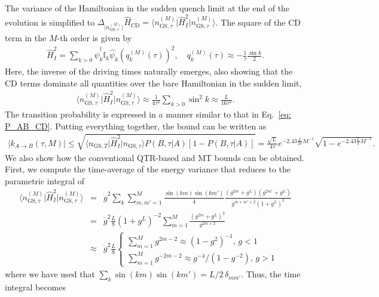 \documentclass[prl,aps,amssymb,twocolumn,superscriptaddress, notitlepage, longbibliography]{revtex4-2}
\begin{document}
The variance of the Hamiltonian in the sudden quench limit at the end of the evolution is simplified to $\Delta_{\lvert n^{(M)}_{\mathrm{GS},\tau}\rangle}\hat H_\mathrm{CD}=\langle n^{(M)}_{\mathrm{GS},\tau}\lvert\hat H^2_I\rvert n^{(M)}_{\mathrm{GS},\tau}\rangle$. The square of the CD term in the $M$-th order is given by
\begin{eqnarray}
\hat H^2_I=\sum_{k>0}\hat\psi^\dagger_k\mathbb I_k\hat\psi_k\left(q^{(M)}_k(\tau)\right)^2,\quad q^{(M)}_k(\tau)\approx-\frac{1}{\tau}\frac{\sin k}{2}.
\end{eqnarray}
Here, the inverse of the driving times naturally emerges, also showing that the CD terms dominate all quantities over the bare Hamiltonian in the sudden limit,
\begin{eqnarray}
    \langle n^{(M)}_{\mathrm{GS},\tau}\lvert\hat H^2_I\rvert n^{(M)}_{\mathrm{GS},\tau}\rangle\approx\frac{1}{4\tau^2}\sum_{k>0}\sin^2k\approx \frac{L}{16\tau^2}.
\end{eqnarray}
The transition probability is expressed in a manner similar to that in Eq.~\eqref{eq: P_AB_CD}.
  Putting everything together, the bound can be written as
\begin{eqnarray}
    \lvert k_{A\rightarrow B}(\tau,M)\rvert\leq \sqrt{\langle n_{\mathrm{GS},T}\lvert\hat H^2_I\rvert n_{\mathrm{GS},\tau}\rangle
    P(B,\tau\vert A)\left[1-P(B,\tau\vert A)\right]}=\frac{\sqrt L}{4\tau}e^{-2.43\frac{L}{2\pi}M^{-1}}\sqrt{1-e^{-2.43\frac{L}{\pi}M^{-1}}}.
\end{eqnarray}
We also show how the conventional QTR-based and MT bounds can be obtained. First, we compute the time-average of the energy variance that reduces to the parametric integral of
\begin{eqnarray}
\langle n^{(M)}_{\mathrm{GS},\tau}\lvert\hat H^2_I\rvert n^{(M)}_{\mathrm{GS},\tau}\rangle&=&\dot g^2\sum_k\sum_{m,m'=1}^M\frac{\sin(km)\sin(km')}{4}\frac{(g^{2m}+g^L)(g^{2m'}+g^L)}{g^{m+m'+2}(1+g^L)^2}\\
&=&\dot g^2\frac{L}{8}(1+g^L)^{-2}\sum_{m=1}^M\frac{(g^{2m}+g^L)^2}{g^{2m+2}}\\ &\approx& \dot g^2\frac{L}{8}
\begin{cases}
\sum_{m=1}^Mg^{2m-2}\approx(1-g^2)^{-1},\,g<1\\
\sum_{m=1}^Mg^{-2m-2}\approx g^{-4}/(1-g^{-2}),\,g>1
\end{cases}\nonumber
\end{eqnarray}
where we have used that $\sum_k\sin(km)\sin(km')=L/2\,\delta_{mm'}$. Thus, the time integral becomes
\end{document}
